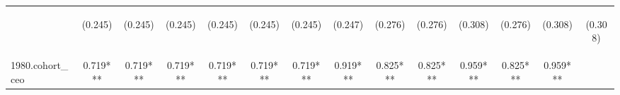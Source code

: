 \begin{center}
\begin{tabular}{lccccccccccccc}
\vspace{4pt} & \begin{footnotesize}(0.245)\end{footnotesize} & \begin{footnotesize}(0.245)\end{footnotesize} & \begin{footnotesize}(0.245)\end{footnotesize} & \begin{footnotesize}(0.245)\end{footnotesize} & \begin{footnotesize}(0.245)\end{footnotesize} & \begin{footnotesize}(0.245)\end{footnotesize} & \begin{footnotesize}(0.247)\end{footnotesize} & \begin{footnotesize}(0.276)\end{footnotesize} & \begin{footnotesize}(0.276)\end{footnotesize} & \begin{footnotesize}(0.308)\end{footnotesize} & \begin{footnotesize}(0.276)\end{footnotesize} & \begin{footnotesize}(0.308)\end{footnotesize} & \begin{footnotesize}(0.308)\end{footnotesize} \\
1980.cohort\_ceo & 0.719*** & 0.719*** & 0.719*** & 0.719*** & 0.719*** & 0.719*** & 0.919*** & 0.825*** & 0.825*** & 0.959*** & 0.825*** & 0.959*** &  \\

\end{tabular}
\end{center}
